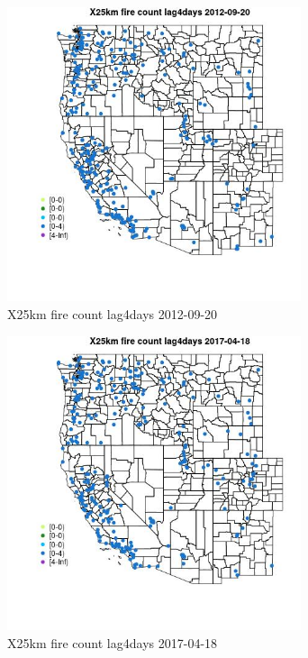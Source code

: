 \begin{figure} 
\centering  
\includegraphics[width=0.77\textwidth]{Code_Outputs/Report_ML_input_PM25_Step4_part_e_de_duplicated_aves_compiled_2019-05-14wNAs_MapObsX25km_fire_count_lag4days2012-09-20.jpg} 
\caption{\label{fig:Report_ML_input_PM25_Step4_part_e_de_duplicated_aves_compiled_2019-05-14wNAsMapObsX25km_fire_count_lag4days2012-09-20}X25km fire count lag4days 2012-09-20} 
\end{figure} 
 

\begin{figure} 
\centering  
\includegraphics[width=0.77\textwidth]{Code_Outputs/Report_ML_input_PM25_Step4_part_e_de_duplicated_aves_compiled_2019-05-14wNAs_MapObsX25km_fire_count_lag4days2017-04-18.jpg} 
\caption{\label{fig:Report_ML_input_PM25_Step4_part_e_de_duplicated_aves_compiled_2019-05-14wNAsMapObsX25km_fire_count_lag4days2017-04-18}X25km fire count lag4days 2017-04-18} 
\end{figure} 
 

